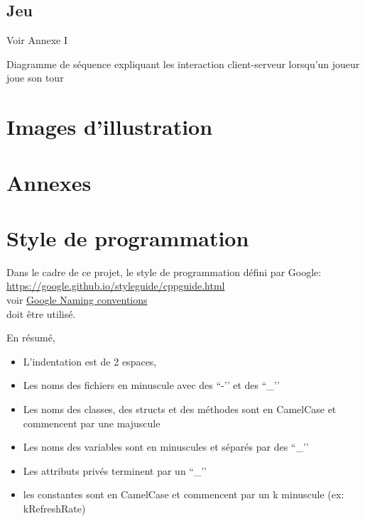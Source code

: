 \documentclass[french, utf8]{article}
\begin{document}


\subsection{Jeu}
Voir Annexe I

Diagramme de séquence expliquant les interaction client-serveur lorsqu'un joueur joue son tour


\section{Images d'illustration}

\section{Annexes}
\appendix

\label{sec:Annexes}
\section{Style de programmation}

Dans le cadre de ce projet, le style de programmation défini par Google:
\\ \href{https://google.github.io/styleguide/cppguide.html}{https://google.github.io/styleguide/cppguide.html}
\\ voir \href{https://google.github.io/styleguide/cppguide.html#Naming}{Google Naming conventions}
\\doit être utilisé.

En résumé,
\begin{itemize}
	\item L'indentation est de 2 espaces,
	\item Les noms des fichiers en minuscule avec des ``-’’ et des ``\_’’
	\item Les noms des classes, des structs et des méthodes sont en CamelCase et commencent par une majuscule
	\item Les noms des variables sont en minuscules et séparés par des ``\_’’
	\item Les attributs privés terminent par un ``\_’’
	\item les constantes sont en CamelCase et commencent par un k minuscule (ex: kRefreshRate)
\end{itemize}
\end{document}

